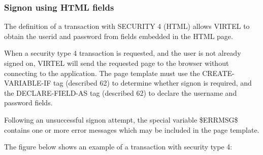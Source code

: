 \documentclass[letterpaper,10pt,english]{sphinxmanual}
\begin{document}
\begin{sphinxVerbatim}[commandchars=\\\{\}]
 
\end{sphinxVerbatim}



\subsubsection{Signon using HTML fields}
\label{\detokenize{User_Guide:v457ug-signon-using-html}}\label{\detokenize{User_Guide:signon-using-html-fields}}
The definition of a transaction with SECURITY 4 (HTML) allows VIRTEL to obtain the userid and password from fields
embedded in the HTML page.

When a security type 4 transaction is requested, and the user is not already signed on, VIRTEL will send the requested
page to the browser without connecting to the application. The page template must use the CREATE-VARIABLE-IF tag
(described 62) to determine whether signon is required, and the DECLARE-FIELD-AS tag (described 62) to declare the
username and password fields.

Following an unsuccessful signon attempt, the special variable \$ERRMSG\$ contains one or more error messages which
may be included in the page template.

The figure below shows an example of a transaction with security type 4:
\end{document}
